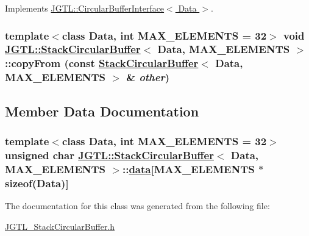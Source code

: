Implements \hyperlink{class_j_g_t_l_1_1_circular_buffer_interface_c6976a1811fdeb5b1810e379022f67ba}{JGTL::Circular\-Buffer\-Interface$<$ Data $>$}.\hypertarget{class_j_g_t_l_1_1_stack_circular_buffer_e5e4f039f4463be0f086d52bb262a314}{
\subsubsection[copyFrom]{\setlength{\rightskip}{0pt plus 5cm}template$<$class Data, int MAX\_\-ELEMENTS = 32$>$ void \hyperlink{class_j_g_t_l_1_1_stack_circular_buffer}{JGTL::Stack\-Circular\-Buffer}$<$ Data, MAX\_\-ELEMENTS $>$::copy\-From (const \hyperlink{class_j_g_t_l_1_1_stack_circular_buffer}{Stack\-Circular\-Buffer}$<$ Data, MAX\_\-ELEMENTS $>$ \& {\em other})}}
\label{class_j_g_t_l_1_1_stack_circular_buffer_e5e4f039f4463be0f086d52bb262a314}




\subsection{Member Data Documentation}
\hypertarget{class_j_g_t_l_1_1_stack_circular_buffer_dd8559d1e2f47be8c10154768a997bfa}{
\subsubsection[data]{\setlength{\rightskip}{0pt plus 5cm}template$<$class Data, int MAX\_\-ELEMENTS = 32$>$ unsigned char \hyperlink{class_j_g_t_l_1_1_stack_circular_buffer}{JGTL::Stack\-Circular\-Buffer}$<$ Data, MAX\_\-ELEMENTS $>$::\hyperlink{class_j_g_t_l_1_1_stack_circular_buffer_dd8559d1e2f47be8c10154768a997bfa}{data}\mbox{[}MAX\_\-ELEMENTS $\ast$sizeof(Data)\mbox{]}}}
\label{class_j_g_t_l_1_1_stack_circular_buffer_dd8559d1e2f47be8c10154768a997bfa}




The documentation for this class was generated from the following file:\begin{CompactItemize}
\item 
\hyperlink{_j_g_t_l___stack_circular_buffer_8h}{JGTL\_\-Stack\-Circular\-Buffer.h}\end{CompactItemize}

